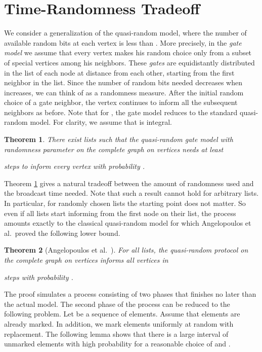 \documentclass{article}
\newtheorem{thm}{Theorem}
\begin{document}
\section{Time-Randomness Tradeoff}

We consider a generalization of the quasi-random model, where the number of available random bits at each vertex is less than .
More precisely, in the \textit{gate model} we assume that every vertex makes his random choice only from a subset of special vertices among his neighbors. These \textit{gates} are equidistantly distributed in the list of each node at distance  from each other, starting from the first neighbor in the list. Since the number of random bits needed decreases when  increases, we can think of  as a randomness measure. After the initial random choice of a gate neighbor, the vertex continues to inform all the subsequent neighbors as before. Note that for , the gate model reduces to the standard quasi-random model. For clarity, we assume that  is integral.
\begin{thm}
\label{lowerbound_gatemodel}
There exist lists such that the quasi-random gate model with randomness parameter  on the complete graph on  vertices needs at least
	
steps to inform every vertex with probability .
\end{thm}
Theorem \ref{lowerbound_gatemodel} gives a natural tradeoff between the amount of randomness used and the broadcast time needed. Note that such a result cannot hold for arbitrary lists. In particular, for randomly chosen lists the starting point does not matter. So even if all lists start informing from the first node on their list, the process amounts exactly to the classical quasi-random model for which Angelopoulos et al.~proved the following lower bound.
\begin{thm}[Angelopoulos et al.~\cite{ADHP09}]
 For all lists, the quasi-random protocol on the complete graph on  vertices informs all vertices in 

steps with probability .
\end{thm}

  



The proof simulates a process consisting of two phases that finishes no later than the actual model. The second phase of the process can be reduced to the following problem.  Let  be a sequence of  elements. Assume that  elements are already marked. In addition, we mark  elements uniformly at random with replacement. The following lemma shows that there is a large interval of unmarked elements with high probability for a reasonable choice of  and . 
\end{document}
